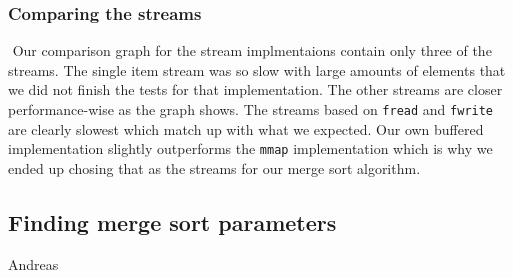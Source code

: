 \subsubsection{Comparing the streams}
\includegraphics[width=0.5]{parts/StreamCompare.png}
Our comparison graph for the stream implmentaions contain only three of the streams. The single item stream was so slow with large amounts of elements that we did not finish the tests for that implementation. The other streams are closer performance-wise as the graph shows. The streams based on \texttt{fread} and \texttt{fwrite} are clearly slowest which match up with what we expected. Our own buffered implementation slightly outperforms the \texttt{mmap} implementation which is why we ended up chosing that as the streams for our merge sort algorithm.

\subsection{ Finding merge sort parameters}
Andreas

